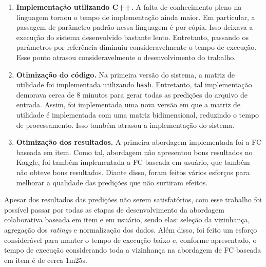 \documentclass[brazil,a4paper,11pt]{article}
\begin{document}
\begin{enumerate}
 \item \textbf{Implementação utilizando C++.} A falta de conhecimento pleno na linguagem tornou o tempo de implementação ainda maior. Em particular, a passagem de parâmetro padrão nessa linguagem é por cópia. Isso deixava a execução do sistema desenvolvido bastante lento. Entretanto, passando os parâmetros por referência diminuiu consideravelmente o tempo de execução.  Esse ponto atrasou consideravelmente o desenvolvimento do trabalho.
 
 \item \textbf{Otimização do código.} Na primeira versão do sistema, a matriz de utilidade foi implementada utilizando \texttt{hash}. Entretanto, tal implementação demorava cerca de 8 minutos para gerar todas as predições do arquivo de entrada. Assim, foi implementada uma nova versão em que a matriz de utilidade é implementada com uma matriz bidimensional, reduzindo o tempo de processamento. Isso também atrasou a implementação do sistema.
 
 \item \textbf{Otimização dos resultados.} A primeira abordagem implementada foi a FC baseada em item. Como tal, abordagem não apresentou bons resultados no Kaggle, foi também implementada a FC baseada em usuário, que também não obteve bons resultados. Diante disso, foram feitos vários esforços para melhorar a qualidade das predições que não surtiram efeitos. 
\end{enumerate}

Apesar dos resultados das predições não serem satisfatórios, com esse trabalho foi possível passar por todas as etapas de desenvolvimento da abordagem colaborativa baseada em item e em usuário, sendo elas: seleção da vizinhança, agregação dos \textit{ratings} e normalização dos dados. Além disso, foi feito um esforço considerável para manter o tempo de execução baixo e, conforme apresentado, o tempo de execução considerando toda a vizinhança na abordagem de FC baseada em item é de cerca 1m25s.


%

\end{document}
